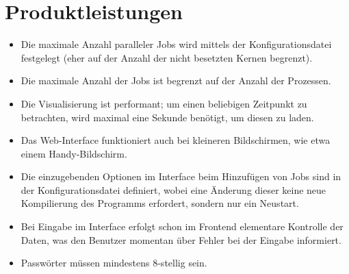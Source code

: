 \section{Produktleistungen}

%

\begin{itemize}
    \item Die maximale Anzahl paralleler Jobs wird mittels der \gls{Konfigurationsdatei} festgelegt (eher auf der Anzahl der nicht besetzten Kernen begrenzt). 
    \item Die maximale Anzahl der Jobs ist begrenzt auf der Anzahl der Prozessen.
    \item Die Visualisierung ist performant; um einen beliebigen Zeitpunkt zu betrachten, wird maximal eine Sekunde benötigt, um diesen zu laden. 
    \item Das \gls{Web-Interface} funktioniert auch bei kleineren Bildschirmen, wie etwa einem Handy-Bildschirm.
    \item Die einzugebenden Optionen im Interface beim Hinzufügen von Jobs sind in der \gls{Konfigurationsdatei} definiert, wobei eine Änderung dieser keine neue Kompilierung des Programms erfordert, sondern nur ein Neustart.
    \item Bei Eingabe im Interface erfolgt schon im Frontend elementare Kontrolle der Daten, was den Benutzer momentan über Fehler bei der Eingabe informiert.
    \item Passwörter müssen mindestens 8-stellig sein.

\end{itemize}
